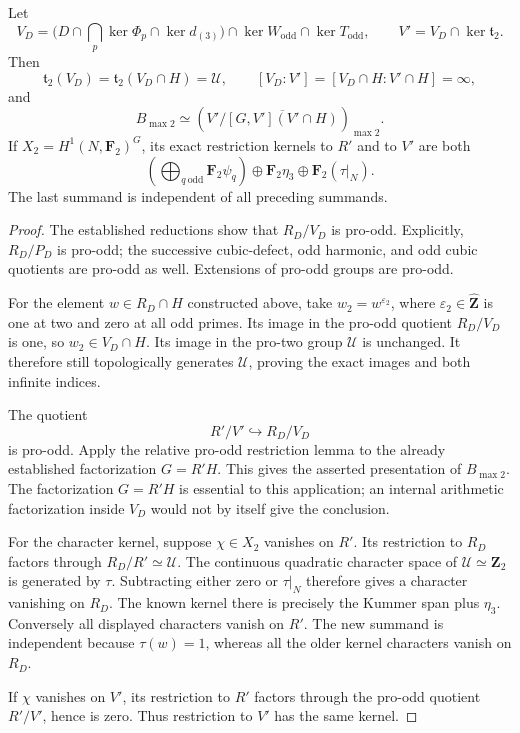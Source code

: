 \begin{corollary}\label{cor:fr-cubic-two-joint-gate}
Let
\[
 V_D=
 \bigl(D\cap\bigcap_p\ker\Phi_p\cap\ker d_{(3)}\bigr)
       \cap\ker W_{\mathrm{odd}}\cap\ker T_{\mathrm{odd}},
 \qquad
 V'=V_D\cap\ker\mathfrak t_2.
\]
Then
\[
 \mathfrak t_2(V_D)=\mathfrak t_2(V_D\cap H)=\mathcal U,
 \qquad [V_D:V']=[V_D\cap H:V'\cap H]=\infty,
\]
and
\[
 B_{\max2}\simeq
 \left(V'/\overline{[G,V'](V'\cap H)}\right)_{\max2}.
\]
If \(X_2=H^1(N,\mathbf F_2)^G\), its exact restriction kernels
to \(R'\) and to \(V'\) are both
\[
 \boxed{\quad
 \left(\bigoplus_{q\ \mathrm{odd}}\mathbf F_2\psi_q\right)
 \oplus\mathbf F_2\eta_3\oplus\mathbf F_2(\tau|_N).
 \quad}
\]
The last summand is independent of all preceding summands.
\end{corollary}

\begin{proof}
The established reductions show that \(R_D/V_D\) is pro-odd.
Explicitly, \(R_D/P_D\) is pro-odd; the successive cubic-defect,
odd harmonic, and odd cubic quotients are pro-odd as well.
Extensions of pro-odd groups are pro-odd.

For the element \(w\in R_D\cap H\) constructed above, take
\(w_2=w^{\varepsilon_2}\), where
\(\varepsilon_2\in\widehat{\mathbf Z}\) is one at two and
zero at all odd primes. Its image in the pro-odd quotient
\(R_D/V_D\) is one, so \(w_2\in V_D\cap H\).
Its image in the pro-two group \(\mathcal U\) is unchanged.
It therefore still topologically generates \(\mathcal U\), proving
the exact images and both infinite indices.

The quotient
\[
                         R'/V'\hookrightarrow R_D/V_D
\]
is pro-odd. Apply the relative pro-odd restriction lemma to the
already established factorization \(G=R'H\).
This gives the asserted presentation of \(B_{\max2}\).
The factorization \(G=R'H\) is essential to this application;
an internal arithmetic factorization inside \(V_D\) would not
by itself give the conclusion.

For the character kernel, suppose \(\chi\in X_2\) vanishes on
\(R'\). Its restriction to \(R_D\) factors through
\(R_D/R'\simeq\mathcal U\). The continuous quadratic character
space of \(\mathcal U\simeq\mathbf Z_2\) is generated by \(\tau\).
Subtracting either zero or \(\tau|_N\) therefore gives a character
vanishing on \(R_D\). The known kernel there is precisely the
Kummer span plus \(\eta_3\).
Conversely all displayed characters vanish on \(R'\).
The new summand is independent because \(\tau(w)=1\), whereas
all the older kernel characters vanish on \(R_D\).

If \(\chi\) vanishes on \(V'\), its restriction to \(R'\) factors
through the pro-odd quotient \(R'/V'\), hence is zero.
Thus restriction to \(V'\) has the same kernel.
\end{proof}

